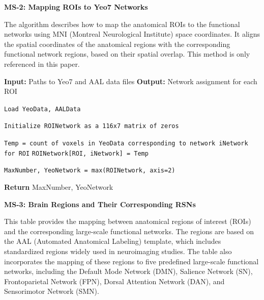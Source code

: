 \documentclass[12pt,technote,onecolumn]{IEEEtran}
\begin{document}
\newpage

\noindent \textbf{MS-2: Mapping ROIs to Yeo7 Networks}
\vspace{4mm}

The algorithm describes how to map the anatomical ROIs to the functional networks using MNI (Montreal Neurological Institute) space coordinates. It aligns the spatial coordinates of the anatomical regions with the corresponding functional network regions, based on their spatial overlap. This method is only referenced in this paper.

\begin{algorithm}
\caption{Mapping ROIs to Yeo7 Networks}
\begin{algorithmic}[1]
\State \textbf{Input:} Paths to Yeo7 and AAL data files
\State \textbf{Output:} Network assignment for each ROI

\State \texttt{Load YeoData, AALData}

\State \texttt{Initialize ROINetwork as a 116x7 matrix of zeros}

        \State \texttt{Temp = count of voxels in YeoData corresponding to network iNetwork for ROI}
        \State \texttt{ROINetwork[ROI, iNetwork] = Temp}
    \EndFor
\EndFor

\State \texttt{MaxNumber, YeoNetwork = max(ROINetwork, axis=2)}

\State \textbf{Return} MaxNumber, YeoNetwork
\end{algorithmic}
\end{algorithm}

\newpage

\noindent \textbf{MS-3: Brain Regions and Their Corresponding RSNs}
\vspace{4mm}

This table provides the mapping between anatomical regions of interest (ROIs) and the corresponding large-scale functional networks. The regions are based on the AAL (Automated Anatomical Labeling) template, which includes standardized regions widely used in neuroimaging studies. The table also incorporates the mapping of these regions to five predefined large-scale functional networks, including the Default Mode Network (DMN), Salience Network (SN), Frontoparietal Network (FPN), Dorsal Attention Network (DAN), and Sensorimotor Network (SMN).
\end{document}
